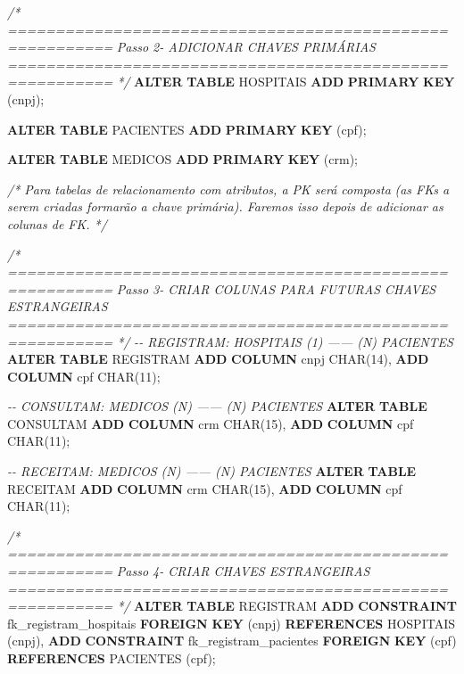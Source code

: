 \documentclass[
]{book}
\newenvironment{Shaded}{\begin{snugshade}}{\end{snugshade}}
\newcommand{\CommentTok}[1]{\textcolor[rgb]{0.56,0.35,0.01}{\textit{#1}}}
\newcommand{\DataTypeTok}[1]{\textcolor[rgb]{0.13,0.29,0.53}{#1}}
\newcommand{\DecValTok}[1]{\textcolor[rgb]{0.00,0.00,0.81}{#1}}
\newcommand{\KeywordTok}[1]{\textcolor[rgb]{0.13,0.29,0.53}{\textbf{#1}}}
\newcommand{\NormalTok}[1]{#1}
\begin{document}
\begin{Shaded}
\begin{Highlighting}[]
\CommentTok{/* =========================================================}
\CommentTok{   Passo 2{-} ADICIONAR CHAVES PRIMÁRIAS}
\CommentTok{   ========================================================= */}
\KeywordTok{ALTER} \KeywordTok{TABLE}\NormalTok{ HOSPITAIS  }\KeywordTok{ADD} \KeywordTok{PRIMARY} \KeywordTok{KEY}\NormalTok{ (cnpj);}

\KeywordTok{ALTER} \KeywordTok{TABLE}\NormalTok{ PACIENTES  }\KeywordTok{ADD} \KeywordTok{PRIMARY} \KeywordTok{KEY}\NormalTok{ (cpf);}

\KeywordTok{ALTER} \KeywordTok{TABLE}\NormalTok{ MEDICOS    }\KeywordTok{ADD} \KeywordTok{PRIMARY} \KeywordTok{KEY}\NormalTok{ (crm);}

\CommentTok{/* Para tabelas de relacionamento com atributos, a PK será composta}
\CommentTok{   (as FKs a serem criadas formarão a chave primária). Faremos isso depois}
\CommentTok{   de adicionar as colunas de FK. */}

\CommentTok{/* =========================================================}
\CommentTok{   Passo 3{-} CRIAR COLUNAS PARA FUTURAS CHAVES ESTRANGEIRAS}
\CommentTok{   ========================================================= */}
\CommentTok{{-}{-} REGISTRAM: HOSPITAIS (1) —— (N) PACIENTES}
\KeywordTok{ALTER} \KeywordTok{TABLE}\NormalTok{ REGISTRAM }\KeywordTok{ADD} \KeywordTok{COLUMN}\NormalTok{ cnpj }\DataTypeTok{CHAR}\NormalTok{(}\DecValTok{14}\NormalTok{), }\KeywordTok{ADD} \KeywordTok{COLUMN}\NormalTok{ cpf  }\DataTypeTok{CHAR}\NormalTok{(}\DecValTok{11}\NormalTok{);}

\CommentTok{{-}{-} CONSULTAM: MEDICOS (N) —— (N) PACIENTES}
\KeywordTok{ALTER} \KeywordTok{TABLE}\NormalTok{ CONSULTAM }\KeywordTok{ADD} \KeywordTok{COLUMN}\NormalTok{ crm  }\DataTypeTok{CHAR}\NormalTok{(}\DecValTok{15}\NormalTok{), }\KeywordTok{ADD} \KeywordTok{COLUMN}\NormalTok{ cpf  }\DataTypeTok{CHAR}\NormalTok{(}\DecValTok{11}\NormalTok{);}

\CommentTok{{-}{-} RECEITAM: MEDICOS (N) —— (N) PACIENTES}
\KeywordTok{ALTER} \KeywordTok{TABLE}\NormalTok{ RECEITAM  }\KeywordTok{ADD} \KeywordTok{COLUMN}\NormalTok{ crm  }\DataTypeTok{CHAR}\NormalTok{(}\DecValTok{15}\NormalTok{), }\KeywordTok{ADD} \KeywordTok{COLUMN}\NormalTok{ cpf  }\DataTypeTok{CHAR}\NormalTok{(}\DecValTok{11}\NormalTok{);}

\CommentTok{/* =========================================================}
\CommentTok{   Passo 4{-} CRIAR CHAVES ESTRANGEIRAS}
\CommentTok{   ========================================================= */}
\KeywordTok{ALTER} \KeywordTok{TABLE}\NormalTok{ REGISTRAM}
    \KeywordTok{ADD} \KeywordTok{CONSTRAINT}\NormalTok{ fk\_registram\_hospitais}
        \KeywordTok{FOREIGN} \KeywordTok{KEY}\NormalTok{ (cnpj)}
        \KeywordTok{REFERENCES}\NormalTok{ HOSPITAIS (cnpj),}
    \KeywordTok{ADD} \KeywordTok{CONSTRAINT}\NormalTok{ fk\_registram\_pacientes}
        \KeywordTok{FOREIGN} \KeywordTok{KEY}\NormalTok{ (cpf)}
        \KeywordTok{REFERENCES}\NormalTok{ PACIENTES (cpf);}


\end{Highlighting}
\end{Shaded}
\end{document}

